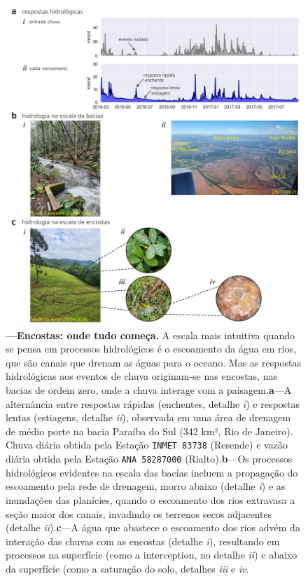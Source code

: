 \documentclass[./main.tex]{subfiles}
\begin{document}
\begin{figure}[t!] 
\centering				
\includegraphics[width=0.98\linewidth]{figs/fig_zero.jpg}		
\caption[Encostas: onde tudo começa]
{\textbf{---\;Encostas: onde tudo começa.}
    A escala mais intuitiva quando se pensa em processos hidrológicos é o escoamento da água em rios, que são canais que drenam as águas para o oceano. Mas as respostas hidrológicas aos eventos de chuva originam-se nas encostas, nas bacias de ordem zero, onde a chuva interage com a paisagem.\;\textbf{a}\;---\;A alternância entre respostas rápidas (enchentes, detalhe \textrm{\textit{i}}) e respostas lentas (estiagens, detalhe \textrm{\textit{ii}}), observada em uma área de drenagem de médio porte na bacia Paraíba do Sul (342 km², Rio de Janeiro). Chuva diária obtida pela Estação \texttt{INMET 83738} (Resende) e vazão diária obtida pela Estação \texttt{ANA 58287000} (Rialto).\;\textbf{b}\;---\;Os processos hidrológicos evidentes na escala das bacias incluem a propagação do escoamento pela rede de drenagem, morro abaixo (detalhe \textrm{\textit{i}}) e as inundações das planícies, quando o escoamento dos rios extravasa a seção maior dos canais, invadindo os terrenos secos adjacentes (detalhe \textrm{\textit{ii}}).\;\textbf{c}\;---\;A água que abastece o escoamento dos rios advém da interação das chuvas com as encostas (detalhe \textrm{\textit{i}}), resultando em processos na superfície (como a \gls{interception}, no detalhe \textrm{\textit{ii}}) e abaixo da superfície (como a saturação do solo, detalhes \textrm{\textit{iii}} e \textrm{\textit{iv}}. 
}
\label{fig:hydro:intro} 		
\end{figure}
\end{document}
